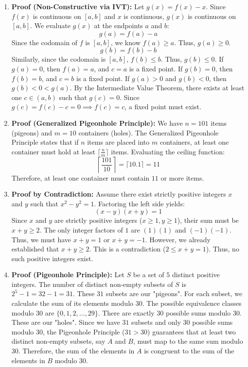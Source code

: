 \documentclass[11pt]{article}
\begin{document}
\begin{enumerate}
    \item \textbf{Proof (Non-Constructive via IVT):} Let $g(x) = f(x) - x$. Since $f(x)$ is continuous on $[a, b]$ and $x$ is continuous, $g(x)$ is continuous on $[a, b]$.
    We evaluate $g(x)$ at the endpoints $a$ and $b$:
    \[ g(a) = f(a) - a \]
    Since the codomain of $f$ is $[a, b]$, we know $f(a) \ge a$. Thus, $g(a) \ge 0$.
    \[ g(b) = f(b) - b \]
    Similarly, since the codomain is $[a, b]$, $f(b) \le b$. Thus, $g(b) \le 0$.
    If $g(a) = 0$, then $f(a) = a$, and $c = a$ is a fixed point.
    If $g(b) = 0$, then $f(b) = b$, and $c = b$ is a fixed point.
    If $g(a) > 0$ and $g(b) < 0$, then $g(b) < 0 < g(a)$. By the Intermediate Value Theorem, there exists at least one $c \in (a, b)$ such that $g(c) = 0$. 
    Since $g(c) = f(c) - c = 0 \implies f(c) = c$, a fixed point must exist. \qedhere

    \item \textbf{Proof (Generalized Pigeonhole Principle):} We have $n = 101$ items (pigeons) and $m = 10$ containers (holes). The Generalized Pigeonhole Principle states that if $n$ items are placed into $m$ containers, at least one container must hold at least $\lceil \frac{n}{m} \rceil$ items.
    Evaluating the ceiling function:
    \[ \left\lceil \frac{101}{10} \right\rceil = \lceil 10.1 \rceil = 11 \]
    Therefore, at least one container must contain $11$ or more items. \qedhere

    \item \textbf{Proof by Contradiction:} Assume there exist strictly positive integers $x$ and $y$ such that $x^2 - y^2 = 1$. Factoring the left side yields:
    \[ (x - y)(x + y) = 1 \]
    Since $x$ and $y$ are strictly positive integers ($x \ge 1, y \ge 1$), their sum must be $x + y \ge 2$. 
    The only integer factors of $1$ are $(1)(1)$ and $(-1)(-1)$. Thus, we must have $x + y = 1$ or $x + y = -1$. 
    However, we already established that $x + y \ge 2$. This is a contradiction ($2 \le x+y = 1$). Thus, no such positive integers exist. \qedhere

    \item \textbf{Proof (Pigeonhole Principle):} Let $S$ be a set of $5$ distinct positive integers. The number of distinct non-empty subsets of $S$ is $2^5 - 1 = 32 - 1 = 31$. These $31$ subsets are our "pigeons".
    For each subset, we calculate the sum of its elements modulo $30$. The possible equivalence classes modulo $30$ are $\{0, 1, 2, \dots, 29\}$. There are exactly $30$ possible sums modulo $30$. These are our "holes".
    Since we have $31$ subsets and only $30$ possible sums modulo $30$, the Pigeonhole Principle ($31 > 30$) guarantees that at least two distinct non-empty subsets, say $A$ and $B$, must map to the same sum modulo $30$. 
    Therefore, the sum of the elements in $A$ is congruent to the sum of the elements in $B$ modulo $30$. \qedhere

\end{enumerate}
\end{document}
